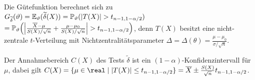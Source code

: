 \begin{Bsp}
    Die Gütefunktion berechnet sich zu
    $G_{\widetilde{\delta}}(\vartheta)
    = \mathbb{E}_\vartheta(\widetilde{\delta}(X))
    = \mathbb{P}_\vartheta(|T(X)| > t_{n-1,1-\alpha/2})$\\
    $= \mathbb{P}_\vartheta\!\left(\left|\frac{\overline{X} - \mu}{S(X)/\sqrt{n}} +
    \frac{\mu - \mu_0}{S(X)/\sqrt{n}}\right| > t_{n-1,1-\alpha/2}\right)$,
    denn $T(X)$ besitzt eine nicht-zentrale $t$-Verteilung mit Nichtzentralitätsparameter
    $\Delta = \Delta(\theta) = \frac{\mu - \mu_0}{\sigma/\sqrt{n}}$.

    Der Annahmebereich $C(X)$ des Tests $\widetilde{\delta}$ ist ein
    $(1-\alpha)$-Konfidenzintervall für $\mu$,
    dabei gilt $C(X) = \{\mu \in \real \;|\; |T(X)| \le t_{n-1,1-\alpha/2}\}
    = \overline{X} \pm \frac{S(X)}{\sqrt{n}} t_{n-1,1-\alpha/2}$.
\end{Bsp}

\pagebreak
